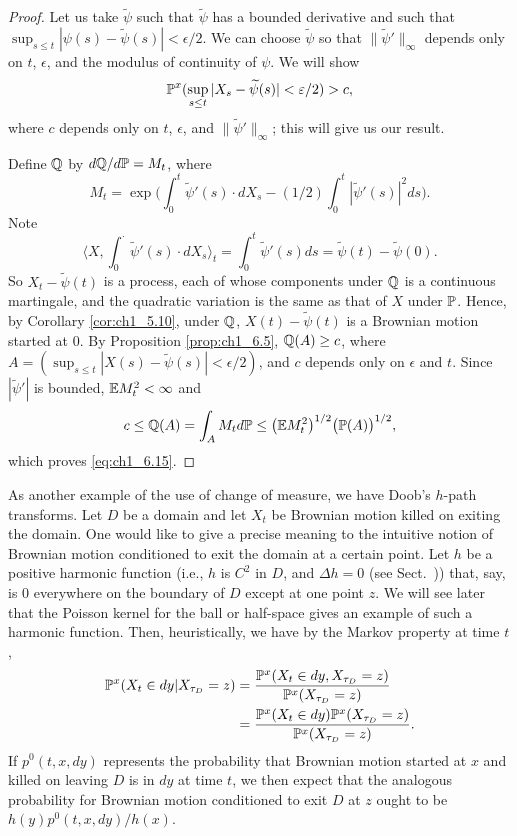 \begin{proof}
Let us take $\widetilde{\psi}$ such that $\widetilde{\psi}$ has a bounded derivative and such that $\sup_{s\leq t} |\psi(s) - \widetilde{\psi}(s)| < \epsilon/2$. We can choose $\widetilde{\psi}$ so that $\|\widetilde{\psi}'\|_\infty$ depends only on $t$, $\epsilon$, and the modulus of continuity of $\psi$. We will show
\begin{equation}\label{eq:ch1_6.15}
    \P^x(\sup_{s\leq t} |X_s - \widetilde{\psi}(s)| < \epsilon/2) > c,
\end{equation}
where $c$ depends only on $t$, $\epsilon$, and $\|\widetilde{\psi}'\|_\infty$; this will give us our result.

Define $\Q$ by $d\Q/d\P = M_t$, where
\[
    M_t = \exp\Big(\int_0^t \widetilde{\psi}'(s) \cdot dX_s - (1/2)\int_0^t |\widetilde{\psi}'(s)|^2 ds\Big).
\]
Note
\[
    \Big\langle X, \int_0^{\cdot} \widetilde{\psi}'(s) \cdot dX_s\Big\rangle_t = \int_0^t \widetilde{\psi}'(s)ds = \widetilde{\psi}(t) - \widetilde{\psi}(0).
\]
So $X_t-\widetilde{\psi}(t)$ is a process, each of whose components under $\Q$ is a continuous martingale, and the quadratic variation is the same as that of $X$ under $\P$. Hence, by Corollary \ref{cor:ch1_5.10}, under $\Q$, $X(t)-\widetilde{\psi}(t)$ is a Brownian motion started at $0$. By Proposition \ref{prop:ch1_6.5}, $\Q(A) \geq c$, where $A = (\sup_{s\leq t} |X(s)-\widetilde{\psi}(s)| < \epsilon/2)$, and $c$ depends only on $\epsilon$ and $t$. Since $|\widetilde{\psi}'|$ is bounded, $\E M_t^2 < \infty$ and
\[
    c \leq \Q(A) = \int_A M_t d\P \leq \big(\E M_t^2\big)^{1/2}\big(\P(A)\big)^{1/2},
\]
which proves \eqref{eq:ch1_6.15}.
\end{proof}

As another example of the use of change of measure, we have Doob's $h$-path transforms. Let $D$ be a domain and let $X_t$ be Brownian motion killed on exiting the domain. One would like to give a precise meaning to the intuitive notion of Brownian motion conditioned to exit the domain at a certain point. Let $h$ be a positive harmonic function (i.e., $h$ is $C^2$ in $D$, and $\Delta h = 0$ (see Sect.\ )) that, say, is $0$ everywhere on the boundary of $D$ except at one point $z$. We will see later that the Poisson kernel for the ball or half-space gives an example of such a harmonic function. Then, heuristically, we have by the Markov property at time $t$,
\begin{align*}
    \P^x(X_t\in dy\mid X_{\tau_D}=z)&=\frac{\P^x(X_t\in dy, X_{\tau_D}=z)}{\P^x(X_{\tau_D}=z)} \\
    &=\frac{\P^x(X_t\in dy)\P^x(X_{\tau_D}=z)}{\P^x(X_{\tau_D}=z)}.
\end{align*}
If $p^0(t, x, dy)$ represents the probability that Brownian motion started at $x$ and killed on leaving $D$ is in $dy$ at time $t$, we then expect that the analogous probability for Brownian motion conditioned to exit $D$ at $z$ ought to be $h(y)p^0(t,x,dy)/h(x)$.

